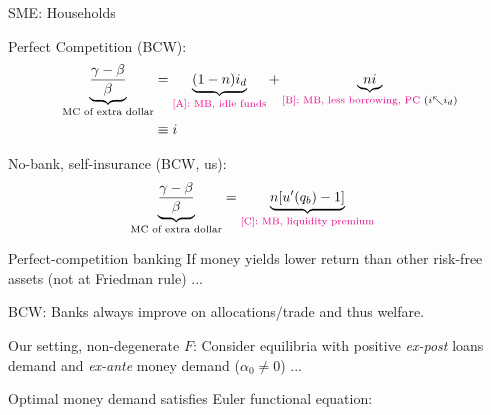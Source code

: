 \documentclass[10pt,english,slidetop,compress,
              blue,mathserif,color=option]{beamer}
\theoremstyle{plain}
\theoremstyle{definition}
\begin{document}
\begin{frame}[allowframebreaks]{SME: Households}
    \break

    \bigskip

    \alert{Perfect Competition (BCW)}: 
    \begin{equation}
        \relsize{-1}
        \begin{split}
            \underbrace{
            \frac{\gamma-\beta}{\beta}
            }_{\text{MC of extra dollar}}
            &=
            \underbrace{
                (1-n)i_{d}
                }_{\text{\color{magenta}[A]: MB, idle funds}}
            + 
            \underbrace{
                n i
                }_{\text{\color{magenta}[B]: MB, less borrowing, PC } (i \nwarrow i_d) }
            \\
            & \equiv
            i
        \end{split}
    \end{equation}


    \alert{No-bank, self-insurance (BCW, us)}: 
    \begin{equation}
        \relsize{-1}
        \begin{split}
            \underbrace{
            \frac{\gamma-\beta}{\beta}
            }_{\text{MC of extra dollar}}
            &=  
            \underbrace{
                n[u'(q_b)-1]
                }_{\text{\color{magenta}[C]: MB, liquidity premium}}
        \end{split}
    \end{equation}

    \begin{block}{Perfect-competition banking}
      If money yields lower return than other risk-free assets (not at Friedman rule) ...
      
      \hfill BCW: Banks always improve on allocations/trade and thus welfare.
    \end{block}

    \break


    \alert{Our setting, non-degenerate $F$}: Consider equilibria with positive \emph{ex-post} loans demand and \emph{ex-ante} money demand ($\alpha_0 \neq 0$)  ...
    \bigskip
    
    Optimal money demand satisfies Euler functional equation:


\end{frame}
\end{document}
